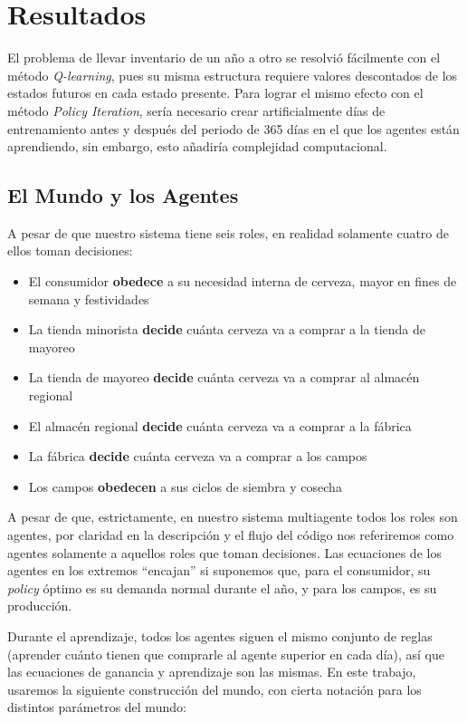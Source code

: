\chapter{Resultados}

El problema de llevar inventario de un a\~no a otro se resolvi\'o f\'acilmente con el m\'etodo \textit{Q-learning}, pues su misma estructura requiere valores descontados de los estados futuros en cada estado presente. Para lograr el mismo efecto con el m\'etodo \textit{Policy Iteration}, ser\'ia necesario crear artificialmente d\'ias de entrenamiento antes y despu\'es del periodo de 365 d\'ias en el que los agentes est\'an aprendiendo, sin embargo, esto a\~nadir\'ia complejidad computacional.

\section{El Mundo y los Agentes}

A pesar de que nuestro sistema tiene seis roles, en realidad solamente cuatro de ellos toman decisiones:

\begin{itemize}
    \item El consumidor \textbf{obedece} a su necesidad interna de cerveza, mayor en fines de semana y festividades
    \item La tienda minorista \textbf{decide} cu\'anta cerveza va a comprar a la tienda de mayoreo
    \item La tienda de mayoreo \textbf{decide} cu\'anta cerveza va a comprar al almac\'en regional
    \item El almac\'en regional \textbf{decide} cu\'anta cerveza va a comprar a la f\'abrica
    \item La f\'abrica \textbf{decide} cu\'anta cerveza va a comprar a los campos
    \item Los campos \textbf{obedecen} a sus ciclos de siembra y cosecha
\end{itemize}

A pesar de que, estrictamente, en nuestro sistema multiagente todos los roles son agentes, por claridad en la descripci\'on y el flujo del c\'odigo nos referiremos como agentes solamente a aquellos roles que toman decisiones. Las ecuaciones de los agentes en los extremos ``encajan'' si suponemos que, para el consumidor, su \textit{policy} \'optimo es su demanda normal durante el a\~no, y para los campos, es su producci\'on.

Durante el aprendizaje, todos los agentes siguen el mismo conjunto de reglas (aprender cu\'anto tienen que comprarle al agente superior en cada d\'ia), as\'i que las ecuaciones de ganancia y aprendizaje son las mismas. En este trabajo, usaremos la siguiente construcci\'on del mundo, con cierta notaci\'on para los distintos par\'ametros del mundo:

